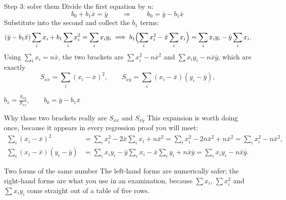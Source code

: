 \documentclass[aspectratio=169]{beamer}
\begin{document}
\begin{frame}[shrink=4]{Step 3: solve them}
  Divide the first equation by $n$:
  \[
    b_0 + b_1 \bar x = \bar y
    \qquad\Longrightarrow\qquad
    \boxed{\,b_0 = \bar y - b_1 \bar x\,}
  \]
  Substitute into the second and collect the $b_1$ terms:
  \[
    (\bar y - b_1\bar x)\sum_i x_i + b_1 \sum_i x_i^2 = \sum_i x_iy_i
    \;\Longrightarrow\;
    b_1\Bigl(\sum_i x_i^2 - \bar x \sum_i x_i\Bigr)
      = \sum_i x_iy_i - \bar y\sum_i x_i .
  \]
  Using $\sum_i x_i = n\bar x$, the two brackets are
  $\sum x_i^2 - n\bar x^2$ and $\sum x_iy_i - n\bar x\bar y$, which are
  exactly
  \[
    S_{xx} = \sum_i (x_i-\bar x)^2, \qquad
    S_{xy} = \sum_i (x_i-\bar x)(y_i-\bar y),
  \]
  \begin{exampleblock}{}
    \centering\large
    $\displaystyle b_1 = \frac{S_{xy}}{S_{xx}}, \qquad
      b_0 = \bar y - b_1\bar x$
  \end{exampleblock}
\end{frame}

\begin{frame}[shrink=6]{Why those two brackets really are $S_{xx}$ and $S_{xy}$}
  This expansion is worth doing once, because it appears in every regression
  proof you will meet:
  \begin{align*}
    \sum_i (x_i - \bar x)^2
      &= \sum_i x_i^2 - 2\bar x\sum_i x_i + n\bar x^2
       = \sum_i x_i^2 - 2n\bar x^2 + n\bar x^2
       = \sum_i x_i^2 - n\bar x^2,\\[0.3em]
    \sum_i (x_i-\bar x)(y_i-\bar y)
      &= \sum_i x_iy_i - \bar y\sum_i x_i - \bar x\sum_i y_i + n\bar x\bar y
       = \sum_i x_iy_i - n\bar x\bar y .
  \end{align*}
  \begin{block}{Two forms of the same number}
    \small The left-hand forms are numerically safer; the right-hand forms
    are what you use in an examination, because $\sum x_i$, $\sum x_i^2$ and
    $\sum x_iy_i$ come straight out of a table of five rows.
  \end{block}
\end{frame}
\end{document}
